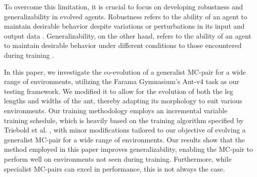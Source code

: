 To overcome this limitation, it is crucial to focus on developing robustness and generalizability in evolved agents. Robustness refers to the ability of an agent to maintain desirable behavior despite variations or perturbations in its input and output data \cite{Ravi_Mangal_2019, Charles_Packer_2019, Xu_Mengdi_2022}. Generalizability, on the other hand, refers to the ability of an agent to maintain desirable behavior under different conditions to those encountered during training \cite{Charles_Packer_2019,Xu_Mengdi_2022}. 

In this paper, we investigate the co-evolution of a generalist MC-pair for a wide range of environments, utilizing the Farama Gymnasium's Ant-v4 task \cite{Gymnasium2023} as our testing framework. We modified it to allow for the evolution of both the leg lengths and widths of the ant, thereby adapting its morphology to suit various environments. Our training methodology employs an incremental variable training schedule, which is heavily based on the training algorithm specified by Triebold et al. \cite{Corinna_Triebold}, with minor modifications tailored to our objective of evolving a generalist MC-pair for a wide range of environments. Our results show that the method employed in this paper improves generalizability, enabling the MC-pair to perform well on environments not seen during training. Furthermore, while specialist MC-pairs can excel in performance, this is not always the case.